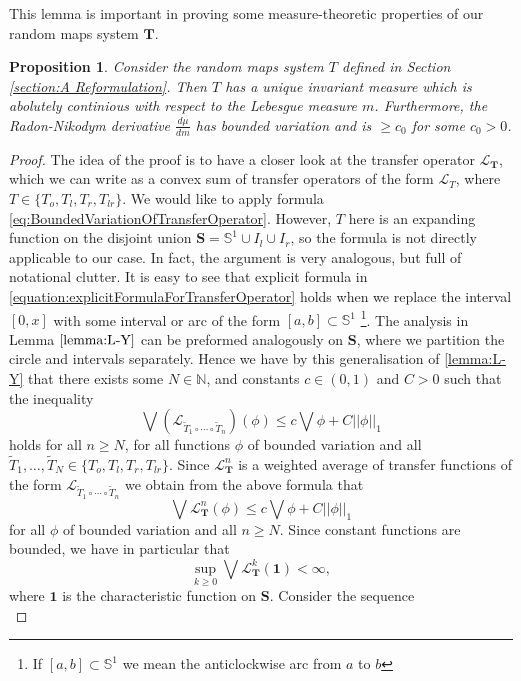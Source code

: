 \documentclass[pdftex,11pt,a4paper,oneside]{article}
\theoremstyle{plain}
\newtheorem{proposition}{Proposition}[section]
\begin{document}
This lemma is important in proving some measure-theoretic properties of our random maps system $\mathbf{T}$. 
\begin{proposition}\label{proposition:ACIPM}
Consider the random maps system $T$ defined in Section \ref{section:A Reformulation}. Then $T$ has a unique invariant measure which is abolutely continious with respect to the Lebesgue measure $m$. Furthermore, the Radon-Nikodym derivative $\frac{d\mu}{d m}$ has bounded variation and is $\geq c_0$ for some $c_0>0$. 
\end{proposition} 
\begin{proof}
The idea of the proof is to have a closer look at the transfer operator $\mathcal{L}_{\mathbf{T}}$, which we can write as a convex sum of transfer operators of the form $\mathcal{L}_{T}$, where $T\in \{T_{o},T_l,T_r,T_{lr}\}$. We would like to apply formula  \eqref{eq:BoundedVariationOfTransferOperator}. However, $T$ here is an expanding function on the disjoint union $\mathbf{S} = \mathbb{S}^1\cup I_l\cup I_r$, so the formula is not directly applicable to our case. In fact, the argument is very analogous, but full of notational clutter. It is easy to see that explicit formula in \eqref{equation:explicitFormulaForTransferOperator} holds when we replace the interval $[0,x]$ with some interval or arc of the form $[a,b]\subset \mathbb{S}^1$ \footnote{If $[a,b]\subset \mathbb{S}^1$ we mean the anticlockwise arc from $a$ to $b$}. The analysis in Lemma $\ref{lemma:L-Y}$ can be preformed analogously on $\mathbf{S}$, where we partition the circle and intervals separately. Hence we have by this generalisation of \ref{lemma:L-Y} that there exists some $N\in\mathbb{N}$, and constants $c\in (0,1)$ and $C>0$ such that the inequality
\[\bigvee \left(\mathcal{L}_{\tilde{T}_1\circ\cdots\circ \tilde{T}_n}\right)(\phi)\leq c\bigvee\phi + C||\phi||_1 \]
holds for all $n\geq N$, for all functions $\phi$ of bounded variation and all $\tilde{T}_1,\ldots,\tilde{T}_N\in \{T_{o},T_l,T_r,T_{lr}\}$. Since $\mathcal{L}^n_{\mathbf{T}}$ is a weighted average of transfer functions of the form $\mathcal{L}_{\tilde{T}_1\circ\cdots\circ \tilde{T}_n}$ we obtain from the above formula that 
\[\bigvee \mathcal{L}_{\mathbf{T}}^n(\phi)\leq c\bigvee\phi + C||\phi||_1\]
for all $\phi$ of bounded variation and all $n\geq N$. Since constant functions are bounded, we have in particular that
\[\sup_{k\geq0}\bigvee \mathcal{L}_{\mathbf{T}}^k(\mathbf{1}) <\infty,\]
where $\mathbf{1}$ is the characteristic function on $\mathbf{S}$. Consider the sequence 
\begin{equation}\label{eq:definition of f_n}

\end{equation}
\end{proof}
\end{document}
